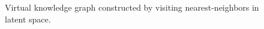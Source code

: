 \documentclass[sigconf,review,anonymous]{acmart}
\begin{document}
\begin{figure}[H]
    \caption{Virtual knowledge graph constructed by visiting nearest-neighbors in latent space.}
    \label{fig:graphs}
  \end{figure}
\end{document}
